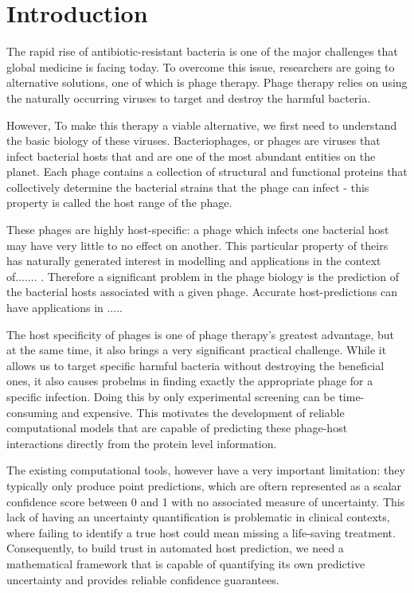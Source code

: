 
\section{Introduction}
\label{sec1:introduction}

\noindent 

The rapid rise of antibiotic-resistant bacteria is one of the major challenges that global medicine is facing today. 
To overcome this issue, researchers are going to alternative solutions, one of which is phage therapy. 
Phage therapy relies on using the naturally occurring viruses to target and destroy the harmful bacteria.

However, To make this therapy a viable alternative, we first need to understand the basic biology of these viruses.
Bacteriophages, or phages are viruses that infect bacterial hosts that and are one of the most abundant entities on the planet.
Each phage contains a collection of structural and functional proteins that collectively determine the bacterial strains that
the phage can infect - this property is called the host range of the phage.

These phages are highly host-specific: a phage which infects one bacterial host may have very little
to no effect on another. This particular property of theirs has naturally generated interest in modelling and applications in the context of.......
. Therefore a significant problem in the phage biology is the prediction of the bacterial
hosts associated with a given phage. Accurate host-predictions can have applications in .....

The host specificity of phages is one of phage therapy’s greatest advantage, but at the same time, it also 
brings a very significant practical challenge. While it allows us to target specific harmful bacteria without 
destroying the beneficial ones, it also causes probelms in finding exactly the appropriate phage for a specific infection. Doing
this by only experimental screening can be time-consuming and expensive. This motivates the development of 
reliable computational models that are capable of predicting these phage-host interactions directly from the protein level information.

The existing computational tools, however have a very important limitation: they typically only produce
point predictions, which are oftern represented as a scalar confidence score between 0 and 1 with no 
associated measure of uncertainty. This lack of having an uncertainty quantification is problematic in 
clinical contexts, where failing to identify a true host could mean missing a life-saving treatment. 
Consequently, to build trust in automated host prediction, we need a mathematical framework that is capable of 
quantifying its own predictive uncertainty and provides reliable confidence guarantees.

